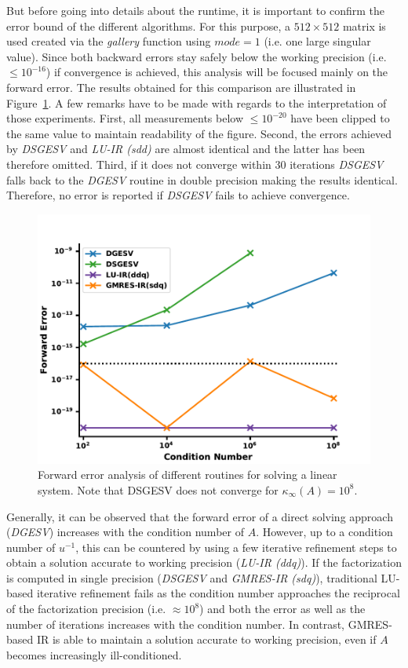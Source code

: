 \noindent But before going into details about the runtime, it is important to confirm the error bound of the different algorithms. For this purpose, a $512 \times 512$ matrix is used created via the \textit{gallery} function using $mode = 1$ (i.e. one large singular value). Since both backward errors stay safely below the working precision (i.e. $\leq 10^{-16}$) if convergence is achieved, this analysis will be focused mainly on the forward error. The results obtained for this comparison are illustrated in Figure~\hyperref[fig:ir3_ac]{\ref{fig:ir3_ac}}. A few remarks have to be made with regards to the interpretation of those experiments. First, all measurements below $\leq 10^{-20}$ have been clipped to the same value to maintain readability of the figure. Second, the errors achieved by \textit{DSGESV} and \textit{LU-IR (sdd)} are almost identical and the latter has been therefore omitted. Third, if it does not converge within 30 iterations \textit{DSGESV} falls back to the \textit{DGESV} routine in double precision making the results identical. Therefore, no error is reported if \textit{DSGESV} fails to achieve convergence.

\begin{figure}[h]
    \centering
    \includegraphics[width=0.9\linewidth]{chapters/5_experiments/figures/IR3_acc.pdf}
    \caption[IR - Forward Error 1]{Forward error analysis of different routines for solving a linear system. Note that DSGESV does not converge for $\kappa_\infty(A)=10^8$.}
    \label{fig:ir3_ac}
\end{figure}

Generally, it can be observed that the forward error of a direct solving approach (\textit{DGESV}) increases with the condition number of $A$. However, up to a condition number of $u^{-1}$, this can be countered by using a few iterative refinement steps to obtain a solution accurate to working precision (\textit{LU-IR (ddq)}). If the factorization is computed in single precision (\textit{DSGESV} and \textit{GMRES-IR (sdq)}), traditional LU-based iterative refinement fails as the condition number approaches the reciprocal of the factorization precision (i.e. $\approx 10^8$) and both the error as well as the number of iterations increases with the condition number. In contrast, GMRES-based IR is able to maintain a solution accurate to working precision, even if $A$ becomes increasingly ill-conditioned.

